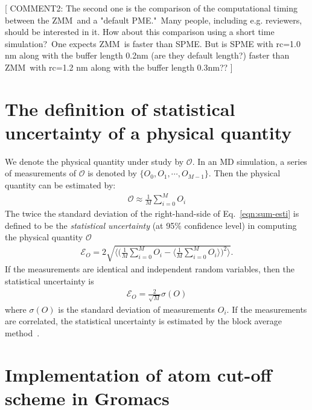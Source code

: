 \documentclass[a4paper,preprint,unsortedaddress,onecolumn,fleqn]{revtex4}
\begin{document}
[ {\color{blue} COMMENT2: The second one is the comparison of the
computational timing between the ZMM\ and a "default PME."\ Many people,
including e.g. reviewers, should be interested in it. How about this
comparison using a short time simulation?\ One expects ZMM\ is faster than
SPME. But is SPME with rc=1.0 nm along with the buffer length 0.2nm (are
they default length?) faster than ZMM\ with rc=1.2 nm along with the buffer
length 0.3nm?? }]

\appendix

\section{The definition of statistical uncertainty of a physical quantity}
\label{app:error}

We denote the physical quantity under study by $\mathcal O$. In an MD simulation,
a series of measurements of $\mathcal O$ is denoted by $\{O_0, O_1, \cdots, O_{M-1}\}$.
Then the physical quantity can be estimated by:
\begin{align}\label{eqn:sum-esti}
  \mathcal O \approx \frac 1M \sum_{i=0}^M O_i
\end{align}
The twice the standard deviation of the right-hand-side of Eq.~\eqref{eqn:sum-esti}
is defined to be the \emph{statistical uncertainty} (at 95\% confidence level) in computing
the  physical quantity $\mathcal O$
\begin{align}
  \mathcal E_{O} = 2\sqrt{\Big\langle
  \Big(
  \frac 1M \sum_{i=0}^M O_i - 
  \Big\langle \frac 1M \sum_{i=0}^M O_i \Big \rangle
  \Big)^2
  \Big \rangle}.
\end{align}
If the measurements are identical and independent random variables,
then the statistical uncertainty is
\begin{align}
  \mathcal E_{O} = \frac{2}{\sqrt M} \sigma({O})
\end{align}
where $\sigma({O})$ is the standard deviation of measurements $O_i$.
If the measurements are correlated, the statistical uncertainty is estimated
by the block average method~\cite{janke2002statistical}.


\section{Implementation of atom cut-off scheme in Gromacs}

\label{app:cut-off}
\end{document}
